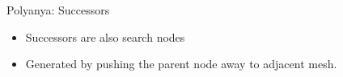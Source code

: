 \begin{frame}{Polyanya: Successors}
    \begin{minipage}{.4\textwidth}
        \begin{itemize}
            \item \small{Successors are also search nodes}
            \item \small{Generated by pushing the parent node away to adjacent mesh.}
        \end{itemize}
    \end{minipage}%
    \begin{minipage}{.6\textwidth}
    \begin{adjustbox}{max totalsize={.9\textwidth}{.9\textheight}, right}
    \end{adjustbox}
    \end{minipage}
\end{frame}


